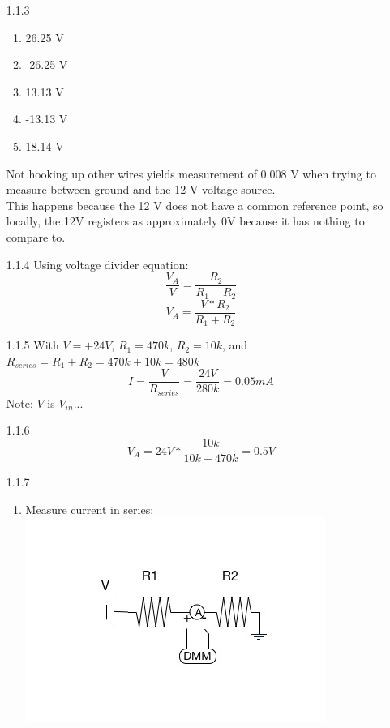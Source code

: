 \documentclass{article}
\begin{document}
\begin{itemize}
\begin{center}
    \end{center}
    \item[1.1.3]
    \begin{enumerate}[label=\alph*] 
        \item 26.25 V
        \item -26.25 V
        \item 13.13 V
        \item -13.13 V
        \item 18.14 V
    \end{enumerate} 
    Not hooking up other wires yields measurement of 0.008 V when trying to measure between ground and the 12 V voltage source.\\ This happens because the 12 V does not have a common reference point, so locally, the 12V registers as approximately 0V because it has nothing to compare to. 
    \item[1.1.4] Using voltage divider equation:
    \begin{equation}
        \frac{V_A}{V} = \frac{R_2}{R_1 + R_2}
    \end{equation}
    \begin{equation}
        V_A = \frac{V*R_2}{R_1 + R_2}
    \end{equation}
    \item[1.1.5] With $V = +24V$, $R_1 = 470k$, $R_2 = 10k$, and $R_{series} = R_1 + R_2 = 470k + 10k = 480k$
    \begin{equation}
        I = \frac{V}{R_{series}} = \frac{24V}{280k} = 0.05 mA
    \end{equation}
    Note: $V$ is $V_{in}$...
    \item[1.1.6]
    \begin{equation}
        V_A = 24V * \frac{10k}{10k + 470k} = 0.5V
    \end{equation}
    \item[1.1.7] 
    \begin{enumerate}[label=\alph*]
    \item Measure current in series: \includegraphics[scale=0.5]{Current.jpg}

\end{enumerate}
\end{itemize}
\end{document}
